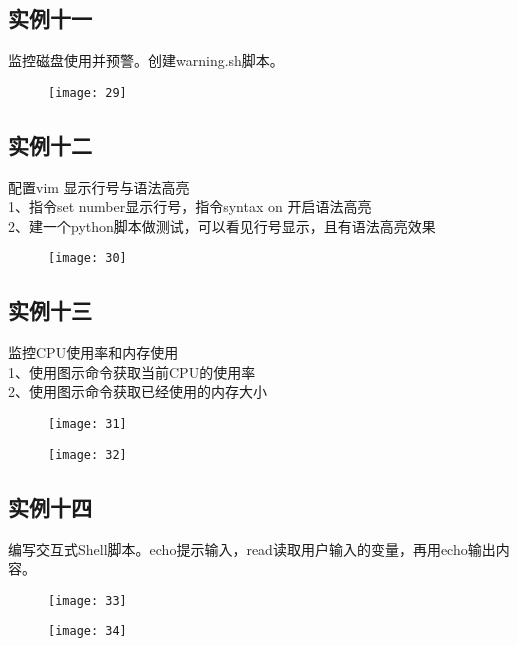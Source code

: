\documentclass[12pt,letterpaper]{article}
\begin{document}
\subsection{实例十一}
监控磁盘使用并预警。创建warning.sh脚本。
\begin{figure}[H]
\centering
\texttt{[image: 29]}
\end{figure}

\subsection{实例十二}
配置vim 显示行号与语法高亮\\
1、指令set number显示行号，指令syntax on 开启语法高亮\\
2、建一个python脚本做测试，可以看见行号显示，且有语法高亮效果
\begin{figure}[H]
\centering
\texttt{[image: 30]}
\end{figure}

\subsection{实例十三}
监控CPU使用率和内存使用\\
1、使用图示命令获取当前CPU的使用率\\
2、使用图示命令获取已经使用的内存大小
\begin{figure}[H]
\centering
\texttt{[image: 31]}
\end{figure}
\vspace{-6mm}
\begin{figure}[H]
\centering
\texttt{[image: 32]}
\end{figure}

\subsection{实例十四}
编写交互式Shell脚本。echo提示输入，read读取用户输入的变量，再用echo输出内容。
\begin{figure}[H]
\centering
\texttt{[image: 33]}
\end{figure}
\vspace{-6mm}
\begin{figure}[H]
\centering
\texttt{[image: 34]}
\end{figure}
\end{document}
